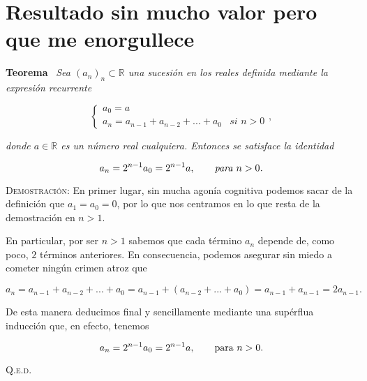 \documentclass{article}
\begin{document}
\newpage

\section{Resultado sin mucho valor pero que me enorgullece}

\textbf{Teorema} \, \textit{Sea $(a_n)_n \subset \mathbb{R}$ una sucesión en los reales definida mediante la expresión recurrente}

\[
\begin{cases}
    a_0 = a \\
    a_n = a_{n - 1} + a_{n - 2} + ... + a_0 & \textit{si $n > 0$}
\end{cases},
\]

\noindent \textit{donde $a \in \mathbb{R}$ es un número real cualquiera. Entonces se satisface la identidad}

\[a_n = 2^{n - 1}a_0 = 2^{n - 1}a, \hspace{20px} \textit{para $n > 0$.}\]

\vspace{10px}

\noindent \textsc{Demostración}: En primer lugar, sin mucha agonía cognitiva podemos sacar de la definición que $a_1 = a_0 = 0$, por lo que nos centramos en lo que resta de la demostración en $n > 1$.

En particular, por ser $n > 1$ sabemos que cada término $a_n$ depende de, como poco, $2$ términos anteriores. En consecuencia, podemos asegurar sin miedo a cometer ningún crimen atroz que

\[a_n = a_{n - 1} + a_{n - 2} + ... + a_0 = a_{n - 1} + (a_{n - 2} + ... + a_0) = a_{n - 1} + a_{n - 1} = 2a_{n - 1}.\]

\noindent De esta manera deducimos final y sencillamente mediante una supérflua inducción que, en efecto, tenemos

\[a_n = 2^{n - 1}a_0 = 2^{n - 1}a, \hspace{20px} \text{para $n > 0$.}\]

\hfill{\textsc{Q.e.d.}}
\end{document}
